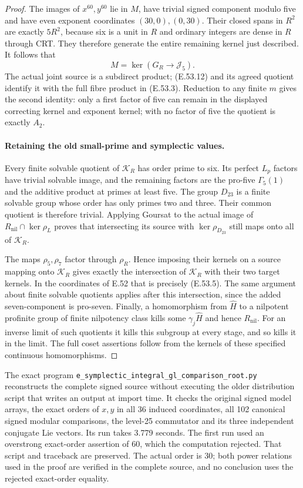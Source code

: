 \begin{proof}
The images of $x^{60},y^{60}$ lie in $M$, have
trivial signed component modulo five and have
even exponent coordinates $(30,0),(0,30)$.
Their closed spans in $R^2$ are exactly $5R^2$,
because six is a unit in $R$ and ordinary integers
are dense in $R$ through CRT.
They therefore generate the entire remaining
kernel just described. It follows that
\[
                       M=\ker(G_R\to\mathcal J_5).
 \tag{E.53.12}
\]
The actual joint source is a subdirect product;
\textup{(E.53.12)} and its agreed quotient identify
it with the full fibre product in
\textup{(E.53.3)}.
Reduction to any finite $m$ gives the second
identity: only a first factor of five can remain
in the displayed correcting kernel and exponent
kernel; with no factor of five the quotient is
exactly $A_2$.

\paragraph{Retaining the old small-prime and symplectic values.}
Every finite solvable quotient of $\mathcal K_R$
has order prime to six. Its perfect $L_p$ factors
have trivial solvable image, and the remaining
factors are the pro-five $\Gamma_5(1)$ and the
additive product at primes at least five.
The group $D_{23}$ is a finite solvable group whose
order has only primes two and three.
Their common quotient is therefore trivial.
Applying Goursat to the actual image of
$R_{\mathrm{nil}}\cap\ker\rho_L$ proves that
intersecting its source with $\ker\rho_{D_{23}}$
still maps onto all of $\mathcal K_R$.

The maps $\rho_5,\rho_7$ factor through $\rho_R$.
Hence imposing their kernels on a source mapping
onto $\mathcal K_R$ gives exactly the intersection
of $\mathcal K_R$ with their two target kernels.
In the coordinates of E.52 that is precisely
\textup{(E.53.5)}.
The same argument about finite solvable quotients
applies after this intersection, since the added
seven-component is pro-seven.
Finally, a homomorphism from $\widehat H$ to a
nilpotent profinite group of finite nilpotency
class kills some $\gamma_j\widehat H$ and hence
$R_{\mathrm{nil}}$. For an inverse limit of such
quotients it kills this subgroup at every stage,
and so kills it in the limit.
The full coset assertions follow from the kernels
of these specified continuous homomorphisms.
\end{proof}

The exact program
\texttt{e\_symplectic\_integral\_gl\_comparison\_root.py}
reconstructs the complete signed source without executing
the older distribution script that writes an output at
import time. It checks the original signed model arrays,
the exact orders of $x,y$ in all 36 induced coordinates,
all 102 canonical signed modular comparisons, the
level-25 commutator and its three independent conjugate
Lie vectors. Its run takes 3.779 seconds.
The first run used an overstrong exact-order assertion
of 60, which the computation rejected. That script and
traceback are preserved. The actual order is 30; both
power relations used in the proof are verified in the
complete source, and no conclusion uses the rejected
exact-order equality.
